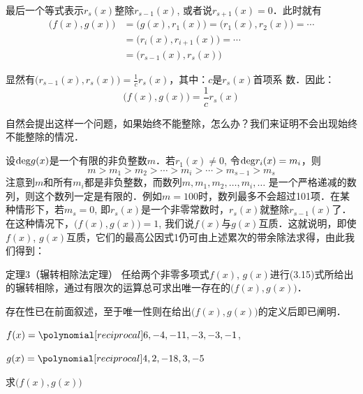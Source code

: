 最后一个等式表示$r_s(x)$整除$r_{s-1}(x)$, 或者说$r_{s+1}(x)=0$．此时就有
\[\begin{split}
    \big(f(x), g(x)\big)&=\big(g(x),r_1(x)\big)=\big(r_1(x),r_2(x)\big)=\cdots\\
    &=\big(r_i(x),r_{i+1}(x)\big)=\cdots\\
    &=\big(r_{s-1}(x),r_s(x)\big)
\end{split}\]

显然有$\big(r_{s-1}(x),r_s(x)\big)=\frac{1}{c}r_s(x)$，其中：$c$是$r_s(x)$首项系
数．因此：
\[\big(f(x), g(x)\big)=\frac{1}{c}r_s(x)\]

自然会提出这样一个问题，如果始终不能整除，怎么办？我们来证明不会出现始终不能整除的情况．

设${\rm deg}g(x)$是一个有限的非负整数$m$．若$r_1(x)\ne 0$, 令${\rm deg}r_i(x)=m_i$，则
\[m>m_1>m_2>\cdots>m_i>\cdots>m_{s-1}>m_s\]
注意到$m$和所有$m_i$都是非负整数，而数列$m,m_1,m_2,\ldots,m_i,\ldots$
是一个严格递减的数列，则这个数列一定是有限的．例如$m=100$时，数列最多不会超过101项．在某种情形下，若$m_s=0$, 即$r_s(x)$是一个非零常数时，$r_s(x)$就整除$r_{s-1}(x)$了．在这种情况下，$\big(f(x),g(x)\big)=1$, 我们说$f(x)$与$g(x)$互质．这就说明，即使$f(x)$, $g(x)$互质，它们的最高公因式1仍可由上述累次的带余除法求得，由此我们得到：

\begin{blk}{定理3（辗转相除法定理）}
  任给两个非零多项式$f(x)$, $g(x)$进行(3.15)式所给出的辗转相除，通过有限次的运算总可求出唯一存在的$\big(f(x),g(x)\big)$．
\end{blk}

 存在性已在前面叙述，至于唯一性则在给出$\big(f(x),g(x)\big)$的定义后即已阐明．  

\begin{example}
$f(x)=\poly{6,-4,-11,-3,-3,-1}$, 

$g(x)=\poly{4,2,-18,3,-5}$

求$\big(f(x),g(x)\big)$
\end{example}

